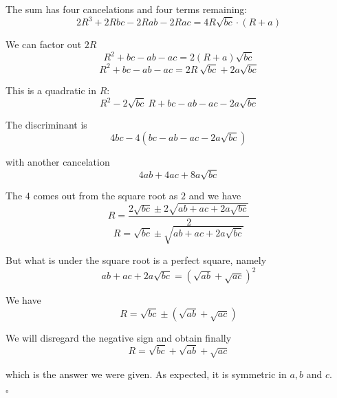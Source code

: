 \documentclass[11pt, oneside]{article}
\begin{document}
The sum has four cancelations and four terms remaining:
\[ 2R^3 + 2Rbc - 2Rab - 2Rac =  4R \sqrt{bc} \cdot (R + a) \]

We can factor out $2R$
\[ R^2 + bc - ab - ac =  2 (R + a) \sqrt{bc} \]
\[ R^2 + bc - ab - ac =  2R \ \sqrt{bc} + 2a \sqrt{bc} \]

This is a quadratic in $R$:
\[ R^2 - 2 \sqrt{bc} \ R + bc - ab - ac - 2a \sqrt{bc} \]

The discriminant is
\[ 4bc - 4(bc - ab - ac - 2a \sqrt{bc}) \]

with another cancelation
\[ 4ab + 4ac + 8a \sqrt{bc} \]

The $4$ comes out from the square root as $2$ and we have
\[ R = \frac{2 \sqrt{bc} \pm 2 \sqrt{ab + ac + 2a \sqrt{bc}}}{2} \]
\[ R = \sqrt{bc} \pm \sqrt{ab + ac + 2a \sqrt{bc}} \]

But what is under the square root is a perfect square, namely
\[ ab + ac + 2a \sqrt{bc} = (\sqrt{ab} + \sqrt{ac})^2 \]

We have
\[ R = \sqrt{bc} \pm (\sqrt{ab} + \sqrt{ac}) \]

We will disregard the negative sign and obtain finally
\[ R = \sqrt{bc} + \sqrt{ab} + \sqrt{ac} \]

which is the answer we were given.  As expected, it is symmetric in $a,b$ and $c$.

$\square$
\end{document}
